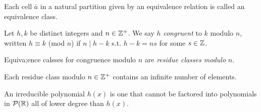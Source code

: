 \begin{definition}
    Each cell $\overline{a}$ in a natural partition given by an equivalence relation is called an equivalence class.
\end{definition}
\begin{definition}
    Let $h,k$ be distinct integers and $n \in \mathbb{Z}^+$. We say $h$ \textit{congruent} to $k$ modulo $n$, written $h \equiv k$ (mod $n$) if $n \mid h-k$ s.t. $h-k = ns$ for some $s \in \mathbb{Z}$.
\end{definition}
\begin{definition}
    Equiva;ence calsses for congruence modulo $n$ are \textit{residue classes modulo} $n$.
\end{definition}
\begin{remark}
    Each residue class modulo $n \in \mathbb{Z}^+$ contains an infinite number of elements.
\end{remark}
\begin{definition}[Irreducible]
    An irreducible polynomial $h(x)$ is one that cannot be factored into polynomials in $\mathcal{P}(\mathbb{R})$ all of lower degree than $h(x)$.
\end{definition}